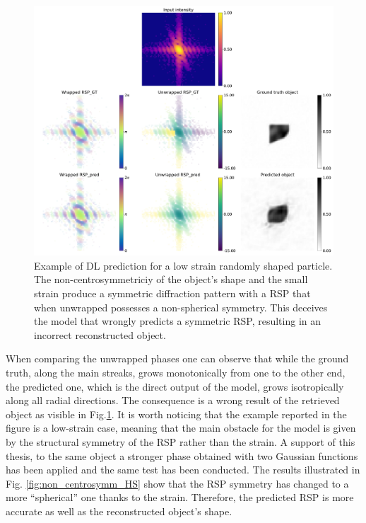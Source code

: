 \begin{figure}[H]
    \centering
    \includegraphics[width=\textwidth]{figures/Phasing/non_centrosymmetric_study_3d_random_LS0.pdf}
    \caption{Example of DL prediction for a low strain randomly shaped particle. The non-centrosymmetriciy of the object's 
    shape and the small strain produce a symmetric diffraction pattern with a RSP that when unwrapped possesses a non-spherical 
    symmetry. This deceives the model that wrongly predicts a symmetric RSP, resulting in an incorrect reconstructed object. }
    \label{fig:non_centrosymm_LS}
\end{figure}

When comparing the unwrapped phases one can observe that while the ground truth, along the main streaks, grows monotonically 
from one to the other end, the predicted one, which is the direct output of the model, grows isotropically along all radial 
directions. The consequence is a wrong result of the retrieved object as visible in Fig.\ref{fig:non_centrosymm_LS}. 
It is worth noticing that the example reported in the figure is a low-strain case, meaning that the main obstacle for 
the model is given by the structural symmetry of the RSP rather than the strain. 
A support of this thesis, to the same object a stronger phase obtained with two Gaussian functions has been applied and 
the same test has been conducted. The results illustrated in Fig. \ref{fig:non_centrosymm_HS} show that the RSP symmetry 
has changed to a more ``spherical'' one thanks to the strain. Therefore, the predicted RSP is more accurate as well as 
the reconstructed object's shape. 

